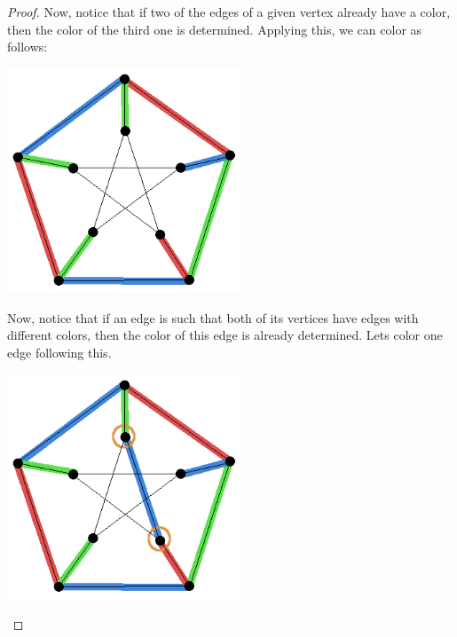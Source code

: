 \begin{proof}
        Now, notice that if two of the edges of a given vertex already have a color, then the color of the third one is determined.
        Applying this, we can color as follows:
        \begin{center}
            \includegraphics[width=7cm]{PetersenIsNotHamiltonian/Petersen3.png}    
        \end{center}\pn
        
        Now, notice that if an edge is such that both of its vertices have edges with different colors, then the color of this edge
        is already determined. Lets color one edge following this.
        \begin{center}
            \includegraphics[width=7cm]{PetersenIsNotHamiltonian/Petersen4.png}    
        \end{center}\pn
        

\end{proof}
